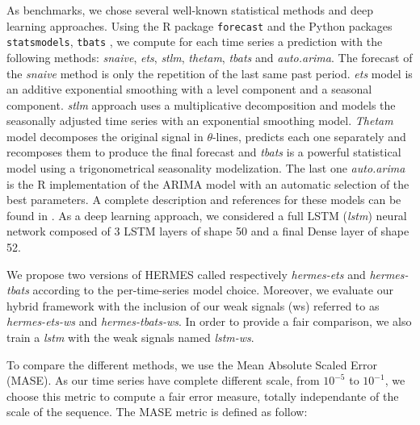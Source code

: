 \documentclass{article} %
\begin{document}
As benchmarks, we chose several well-known statistical methods and deep learning approaches. Using the R package \texttt{forecast} and the Python packages \texttt{statsmodels},  \texttt{tbats} , we compute for each time series a prediction with the following methods: \textit{snaive}, \textit{ets}, \textit{stlm}, \textit{thetam}, \textit{tbats} and \textit{auto.arima}. The forecast of the \textit{snaive} method is only the repetition of the last same past period. \textit{ets} model is an additive exponential smoothing with a level component and a seasonal component. \textit{stlm} approach uses a multiplicative decomposition and models the seasonally adjusted time series with an exponential smoothing model. \textit{Thetam} model decomposes the original signal in $\theta$-lines, predicts each one separately and recomposes them to produce the final forecast and \textit{tbats} is a powerful statistical model using a trigonometrical seasonality modelization. The last one \textit{auto.arima} is the R implementation of the ARIMA model with an automatic selection of the best parameters. A complete description and references for these models can be found in \citep{hyndman2020package}. As a deep learning approach, we considered a full LSTM (\textit{lstm}) neural network composed of 3 LSTM layers of shape 50 and a final Dense layer of shape 52.

We propose two versions of HERMES called respectively \textit{hermes-ets} and \textit{hermes-tbats} according to the per-time-series model choice.
Moreover, we evaluate our hybrid framework with the inclusion of our weak signals (ws) referred to as \textit{hermes-ets-ws} and \textit{hermes-tbats-ws}. In order to provide a fair comparison, we also train a \textit{lstm} with the weak signals named \textit{lstm-ws}.

To compare the different methods, we use the Mean Absolute Scaled Error (MASE). As our time series have complete different scale, from $10^{-5}$ to $10^{-1}$, we choose this metric to compute a fair error measure, totally independante of the scale of the sequence. The MASE metric is defined as follow:
 
\end{document}
